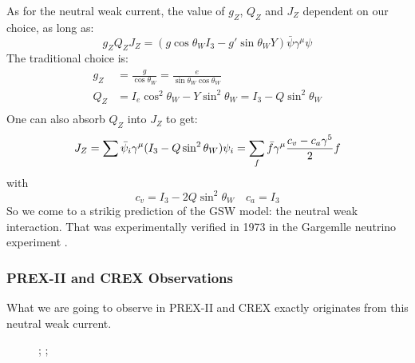 As for the neutral weak current, the value of $g_Z$, $Q_Z$ and $J_Z$ dependent on our choice, 
as long as:
\begin{equation}
    g_Z Q_Z J_Z = (g\cos\theta_W I_3 - g'\sin\theta_W Y)\bar{\psi}\gamma^\mu\psi 
\end{equation}
The traditional choice is:
\begin{equation}
    \begin{aligned}
	g_Z &= \frac{g}{\cos\theta_W} = \frac{e}{\sin\theta_W\cos\theta_W}  \\
	Q_Z &= I_e\cos^2\theta_W - Y\sin^2\theta_W = I_3 - Q\sin^2\theta_W  \\
    \end{aligned}
\end{equation}
One can also absorb $Q_Z$ into $J_Z$ to get:
\begin{equation}
    J_Z = \sum \bar{\psi}_i\gamma^\mu (I_3 - Q\sin^2\theta_W)\psi_i
	= \sum_f \bar{f}\gamma^\mu\frac{c_v - c_a\gamma^5}{2} f \\
\end{equation}
with 
\begin{equation}
    c_v = I_3 - 2Q\sin^2\theta_W    \quad c_a = I_3
\end{equation}
So we come to a strikig prediction of the GSW model: the neutral weak interaction.
That was experimentally verified in 1973 in the Gargemlle neutrino experiment \cite{HASERT19741}.

\subsubsection{PREX-II and CREX Observations}
What we are going to observe in PREX-II and CREX exactly originates from this
neutral weak current.

\begin{figure}[!h]
    \centering
{};
;
\end{figure}

